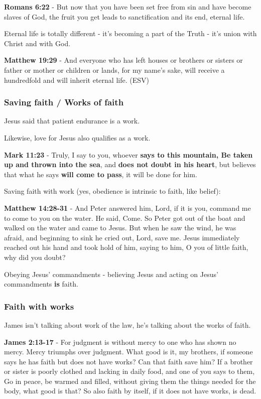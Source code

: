 \documentclass[11pt]{article}
\begin{document}
\textbf{Romans 6:22} - But now that you have been set free from sin and have become slaves of God, the fruit you get leads to sanctification and its end, eternal life.

Eternal life is totally different - it's becoming a part of the Truth - it's union with Christ and with God.

\textbf{Matthew 19:29} -  And everyone who has left houses or brothers or sisters or father or mother or children or lands, for my name's sake, will receive a hundredfold and will inherit eternal life.  (ESV)

\subsubsection{Saving faith / Works of faith}
\label{sec:orga290163}
Jesus said that patient endurance is a work.

Likewise, love for Jesus also qualifies as a work.

\textbf{Mark 11:23} - Truly, I say to you, whoever \textbf{says to this mountain, Be taken up and thrown into the sea}, and \textbf{does not doubt in his heart}, but believes that what he says \textbf{will come to pass}, it will be done for him.

Saving faith with work (yes, obedience is intrinsic to faith, like belief):

\textbf{Matthew 14:28-31} - And Peter answered him, Lord, if it is you, command me to come to you on the water.  He said, Come. So Peter got out of the boat and walked on the water and came to Jesus.  But when he saw the wind, he was afraid, and beginning to sink he cried out, Lord, save me.  Jesus immediately reached out his hand and took hold of him, saying to him, O you of little faith, why did you doubt?

Obeying Jesus' commandments - believing Jesus and acting on Jesus' commandments \textbf{is} faith.

\subsubsection{Faith with works}
\label{sec:org3ab845b}
James isn't talking about work of the law, he's talking about the works of faith.

\textbf{James 2:13-17} - For judgment is without mercy to one who has shown no mercy. Mercy triumphs over judgment. What good is it, my brothers, if someone says he has faith but does not have works? Can that faith save him? If a brother or sister is poorly clothed and lacking in daily food, and one of you says to them, Go in peace, be warmed and filled, without giving them the things needed for the body, what good is that? So also faith by itself, if it does not have works, is dead.
\end{document}

